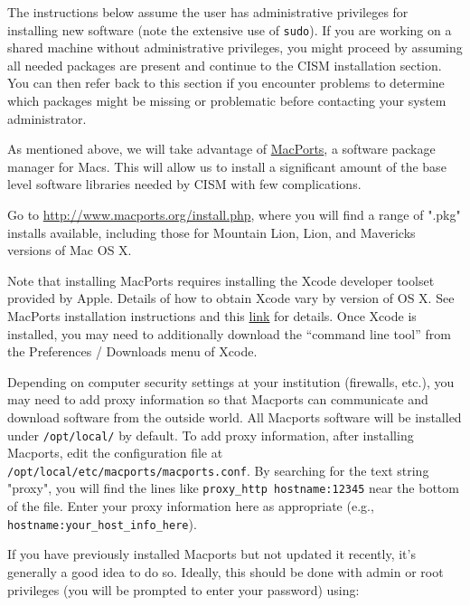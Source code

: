 The instructions below assume the user has administrative privileges for
installing new software (note the extensive use of \texttt{sudo}).  
If you are working on a shared machine without
administrative privileges, you might proceed by assuming all needed packages are present and 
continue to the CISM installation section.  You can then refer back to this
section if you encounter problems to determine which packages might be missing or
problematic before contacting your system administrator.


\begin{mdframed}[style=mac] %
As mentioned above, we will take advantage of \href{http://www.macports.org/}{MacPorts}, 
a software package manager for Macs. This will allow us to install a significant amount 
of the base level software libraries needed by CISM with few complications. 

Go to \href{http://www.macports.org/install.php}{http://www.macports.org/install.php}, where you will find a range of ".pkg" installs available, including those for Mountain Lion, Lion, and Mavericks versions of Mac OS X. 

Note that installing MacPorts requires installing the Xcode developer toolset provided by Apple. Details of how to obtain Xcode vary by version of OS X. See MacPorts installation instructions and this \href{https://developer.apple.com/xcode/downloads/}{link} for details. Once Xcode is installed, you may need to additionally download the ``command line tool'' from the Preferences / Downloads menu of Xcode. 

Depending on computer security settings at your institution (firewalls, etc.), you may need to add proxy information so that Macports can communicate and download software from the outside world. All Macports software will be installed under \texttt{/opt/local/} by default. To add proxy information, after installing Macports, edit the configuration file at \texttt{/opt/local/etc/macports/macports.conf}. By searching for the text string "proxy", you will find the lines like \texttt{proxy\_http hostname:12345} near the bottom of the file. Enter your proxy information here as appropriate (e.g., \texttt{hostname:your\_host\_info\_here}).

If you have previously installed Macports but not updated it recently, it's generally a good idea to do so. Ideally, this should be done with admin or root privileges (you will be prompted to enter your password) using:


\end{mdframed}
